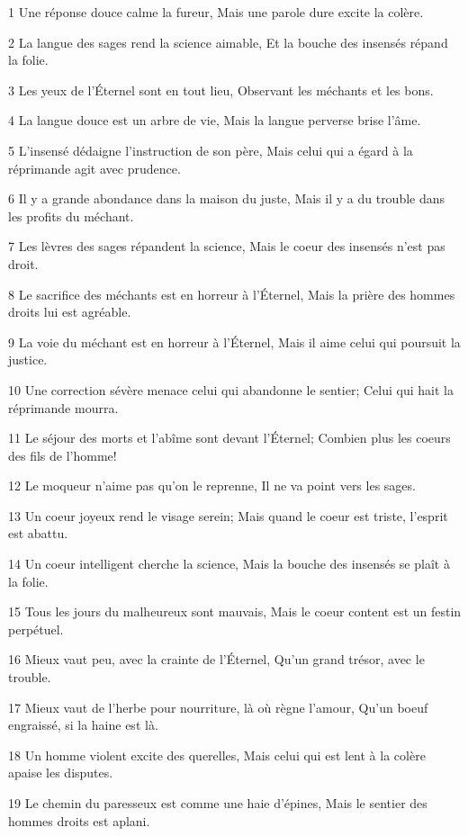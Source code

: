 \par 1 Une réponse douce calme la fureur, Mais une parole dure excite la colère.
\par 2 La langue des sages rend la science aimable, Et la bouche des insensés répand la folie.
\par 3 Les yeux de l'Éternel sont en tout lieu, Observant les méchants et les bons.
\par 4 La langue douce est un arbre de vie, Mais la langue perverse brise l'âme.
\par 5 L'insensé dédaigne l'instruction de son père, Mais celui qui a égard à la réprimande agit avec prudence.
\par 6 Il y a grande abondance dans la maison du juste, Mais il y a du trouble dans les profits du méchant.
\par 7 Les lèvres des sages répandent la science, Mais le coeur des insensés n'est pas droit.
\par 8 Le sacrifice des méchants est en horreur à l'Éternel, Mais la prière des hommes droits lui est agréable.
\par 9 La voie du méchant est en horreur à l'Éternel, Mais il aime celui qui poursuit la justice.
\par 10 Une correction sévère menace celui qui abandonne le sentier; Celui qui hait la réprimande mourra.
\par 11 Le séjour des morts et l'abîme sont devant l'Éternel; Combien plus les coeurs des fils de l'homme!
\par 12 Le moqueur n'aime pas qu'on le reprenne, Il ne va point vers les sages.
\par 13 Un coeur joyeux rend le visage serein; Mais quand le coeur est triste, l'esprit est abattu.
\par 14 Un coeur intelligent cherche la science, Mais la bouche des insensés se plaît à la folie.
\par 15 Tous les jours du malheureux sont mauvais, Mais le coeur content est un festin perpétuel.
\par 16 Mieux vaut peu, avec la crainte de l'Éternel, Qu'un grand trésor, avec le trouble.
\par 17 Mieux vaut de l'herbe pour nourriture, là où règne l'amour, Qu'un boeuf engraissé, si la haine est là.
\par 18 Un homme violent excite des querelles, Mais celui qui est lent à la colère apaise les disputes.
\par 19 Le chemin du paresseux est comme une haie d'épines, Mais le sentier des hommes droits est aplani.

